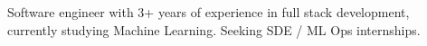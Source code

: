 

\begin{cvparagraph}

Software engineer with 3+ years of experience in full stack development, 
currently studying Machine Learning. 
Seeking SDE / ML Ops internships.
\end{cvparagraph}
